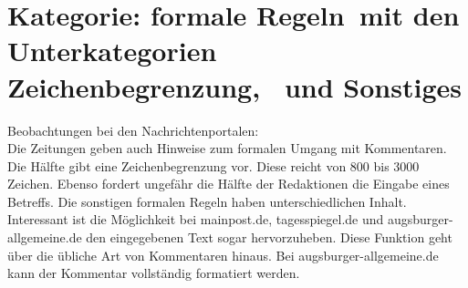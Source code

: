 \section{Kategorie: \glqq formale Regeln\grqq\ mit  den Unterkategorien \glqq Zeichenbegrenzung\grqq, \grqq\ und \glqq Sonstiges\grqq}

Beobachtungen bei den Nachrichtenportalen:\\
Die Zeitungen geben auch Hinweise zum formalen Umgang mit Kommentaren. Die Hälfte gibt eine Zeichenbegrenzung vor. Diese reicht von 800 bis 3000 Zeichen. 
Ebenso fordert ungefähr die Hälfte der Redaktionen die Eingabe eines Betreffs. Die sonstigen formalen Regeln haben unterschiedlichen Inhalt. Interessant ist die Möglichkeit bei mainpost.de, tagesspiegel.de und augsburger-allgemeine.de den eingegebenen Text sogar hervorzuheben. Diese Funktion geht über die übliche Art von Kommentaren hinaus. Bei augsburger-allgemeine.de kann der Kommentar vollständig formatiert werden.


